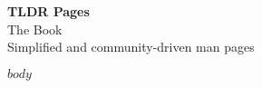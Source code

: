 \documentclass[
    12pt,    %
    DIV12,   %
    a4paper, %
    oneside, %
]{scrreprt}
\begin{document}
    \thispagestyle{plain}

    \begin{titlepage}
        \begin{center}
            \vspace*{11em}
            \huge{\textbf{TLDR Pages}}\\[1em]
            \LARGE{The Book}\\[3em]
            \large{Simplified and community-driven man pages}\\[1em]
        \end{center}
    \end{titlepage}

    \tableofcontents %

    $body$ %
\end{document}
